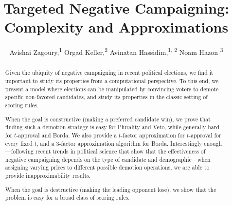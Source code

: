 \documentclass[letterpaper]{article} %
\begin{document}
%

\title{Targeted Negative Campaigning: Complexity and Approximations}
\author{Avishai Zagoury,\textsuperscript{\rm 1} Orgad Keller,\textsuperscript{\rm 2} Avinatan Hassidim,\textsuperscript{\rm 1, \rm2} Noam Hazon \textsuperscript{\rm 3}\\}
\maketitle
\begin{abstract}
Given the ubiquity of negative campaigning in recent political elections, we find it important to study its properties from a computational perspective. To this end, we present a model where elections can be manipulated by convincing voters to demote specific non-favored candidates, and study its properties in the classic setting of scoring rules.

When the goal is constructive (making a preferred candidate win),  we prove that finding such a demotion strategy is easy for Plurality and Veto, while generally hard for $t$-approval and Borda. We also provide a $t$-factor approximation for $t$-approval for every fixed $t$, and a 3-factor approximation algorithm for Borda. Interestingly enough---following recent trends in  political science that show that the effectiveness of negative campaigning depends on the type of candidate and demographic---when assigning varying prices to different possible demotion operations, we are able to provide inapproximability results. 

When the goal is destructive (making the leading opponent lose), we show that the problem is easy for a broad class of scoring rules.
\end{abstract}
\end{document}
